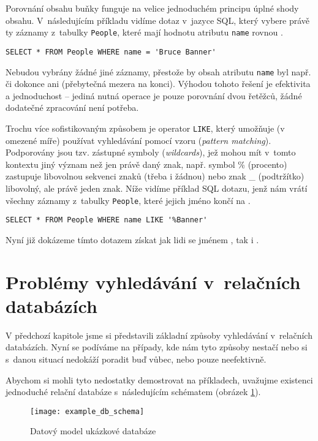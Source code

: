 \documentclass[11pt,oneside]{fithesis2}
\begin{document}
Porovnání obsahu buňky funguje na velice jednoduchém principu úplné shody obsahu. V~následujícím příkladu vidíme dotaz v~jazyce SQL, který vybere právě ty záznamy z~tabulky \texttt{People}, které mají hodnotu atributu \texttt{name} rovnou . 
\begin{verbatim}
SELECT * FROM People WHERE name = 'Bruce Banner'
\end{verbatim}

Nebudou vybrány žádné jiné záznamy, přestože by obsah atributu \texttt{name} byl např.  či dokonce ani  (přebytečná mezera na konci). Výhodou tohoto řešení je efektivita a jednoduchost -- jediná nutná operace je 
pouze porovnání dvou řetěžců, žádné dodatečné zpracování není potřeba. 

Trochu více sofistikovaným způsobem je operator \texttt{LIKE}, který umožňuje (v omezené míře) používat vyhledávání pomocí vzoru (\emph{pattern matching}). Podporovány jsou tzv. zástupné symboly (\emph{wildcards}), jež mohou mít v~tomto kontextu jiný význam než jen právě daný znak, např. symbol \% (procento) zastupuje libovolnou sekvenci znaků (třeba i žádnou) nebo znak \_ (podtržítko) libovolný, ale právě jeden znak. Níže vidíme příklad SQL dotazu, jenž nám vrátí všechny záznamy z~tabulky \texttt{People}, které jejich jméno končí na .

\begin{verbatim}
SELECT * FROM People WHERE name LIKE '%Banner'
\end{verbatim}

Nyní již dokázeme tímto dotazem získat jak lidi se jménem , tak i . 

\section{Problémy vyhledávání v~relačních databázích}
V předchozí kapitole jsme si představili základní způsoby vyhledávání v~relačních databázích. Nyní se podíváme na případy, kde nám tyto způsoby nestačí nebo si s~danou situací nedokáží poradit buď vůbec, nebo pouze neefektivně.

Abychom si mohli tyto nedostatky demostrovat na příkladech, uvažujme existenci jednoduché relační databáze s~následujícím schématem (obrázek \ref{example_schema}).

\begin{figure}[htbp]
	\begin{center}
		\texttt{[image: example\_db\_schema]}
	\end{center}
	\caption{Datový model ukázkové databáze}	
	\label{example_schema}
\end{figure}
\end{document}

